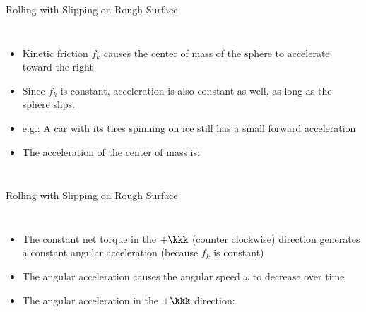 \documentclass[12pt,compress,aspectratio=169]{beamer}
\begin{document}
\begin{frame}{Rolling with Slipping on Rough Surface}
  \begin{columns}
    

    \begin{itemize}
    \item Kinetic friction $f_k$ causes the center of mass of the sphere to
      accelerate toward the right


    \item\vspace{-.2in}Since $f_k$ is constant, acceleration is also constant
      as well, as long as the sphere slips.
    \item e.g.: A car with its tires spinning on ice still has a small
      forward acceleration
    \item The acceleration of the center of mass is:

    \end{itemize}
  \end{columns}
\end{frame}



\begin{frame}{Rolling with Slipping on Rough Surface}
  \begin{columns}
    

    \begin{itemize}
    \item The constant net torque in the $+\kkk$ (counter clockwise) direction
      generates a constant angular acceleration (because $f_k$ is constant)

    \item The angular acceleration causes the angular speed $\omega$ to
      decrease over time
    \item The angular acceleration in the $+\kkk$ direction:

    \end{itemize}
  \end{columns}
\end{frame}
\end{document}
